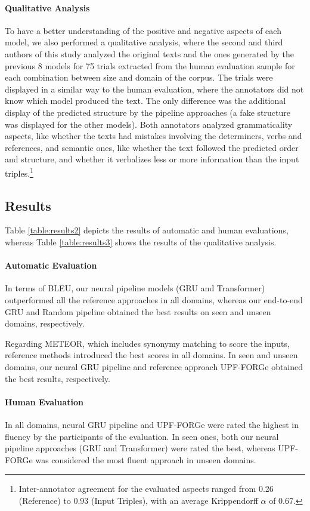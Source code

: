 \documentclass[11pt,a4paper]{article}
\begin{document}
\paragraph{Qualitative Analysis} To have a better understanding of the positive and negative aspects of each model, we also performed a qualitative analysis, where the second and third authors of this study analyzed the original texts and the ones generated by the previous 8 models for 75 trials extracted from the human evaluation sample for each combination between size and domain of the corpus. The trials were displayed in a similar way to the human evaluation, where the annotators did not know which model produced the text. The only difference was the additional display of the predicted structure by the pipeline approaches (a fake structure was displayed for the other models). Both annotators analyzed grammaticality aspects, like whether the texts had mistakes involving the determiners, verbs and references, and semantic ones, like whether the text followed the predicted order and structure, and whether it verbalizes less or more information than the input triples.\footnote{Inter-annotator agreement for the evaluated aspects ranged from 0.26 (Reference) to 0.93 (Input Triples), with an average Krippendorff $\alpha$ of 0.67.}

\subsection{Results}

Table \ref{table:results2} depicts the results of automatic and human evaluations, whereas Table \ref{table:results3} shows the results of the qualitative analysis.

\paragraph{Automatic Evaluation} In terms of BLEU, our neural pipeline models (GRU and Transformer) outperformed all the reference approaches in all domains, whereas our end-to-end GRU and Random pipeline obtained the best results on seen and unseen domains, respectively.

Regarding METEOR, which includes synonymy matching to score the inputs, reference methods introduced the best scores in all domains. In seen and unseen domains, our neural GRU pipeline and reference approach UPF-FORGe obtained the best results, respectively.

\paragraph{Human Evaluation} In all domains, neural GRU pipeline and UPF-FORGe were rated the highest in fluency by the participants of the evaluation. In seen ones, both our neural pipeline approaches (GRU and Transformer) were rated the best, whereas UPF-FORGe was considered the most fluent approach in unseen domains.
\end{document}
